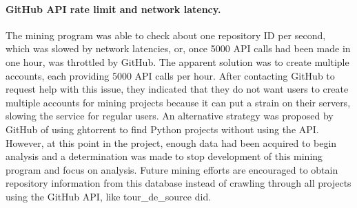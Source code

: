 \paragraph{GitHub API rate limit and network latency.}  The mining program was able to check about one repository ID per second, which was slowed by network latencies, or, once 5000 API calls had been made in one hour, was throttled by GitHub.  The apparent solution was to create multiple accounts, each providing 5000 API calls per hour.  After contacting GitHub to request help with this issue, they indicated that they do not want users to create multiple accounts for mining projects because it can put a strain on their servers, slowing the service for regular users.  An alternative strategy was proposed by GitHub of using ghtorrent to find Python projects without using the API.  However, at this point in the project, enough data had been acquired to begin analysis and a determination was made to stop development of this mining program and focus on analysis.  Future mining efforts are encouraged to obtain repository information from this database instead of crawling through all projects using the GitHub API, like tour\_de\_source did.

